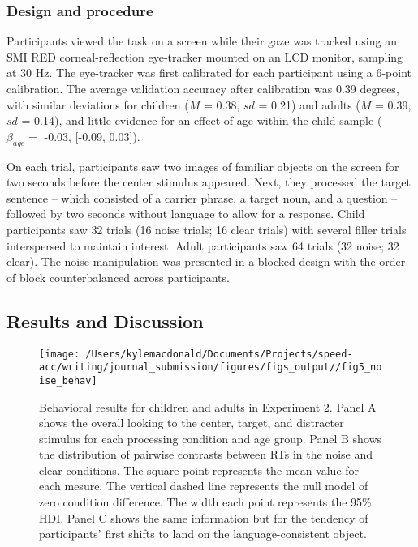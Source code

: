 \documentclass[,man,floatsintext]{apa6}
\begin{document}
\hypertarget{design-and-procedure-1}{%
\subsubsection{Design and procedure}\label{design-and-procedure-1}}

Participants viewed the task on a screen while their gaze was tracked using an SMI RED corneal-reflection eye-tracker mounted on an LCD monitor, sampling at 30 Hz. The eye-tracker was first calibrated for each participant using a 6-point calibration. The average validation accuracy after calibration was 0.39 degrees, with similar deviations for children (\(M\) = 0.38, \(sd\) = 0.21) and adults (\(M\) = 0.39, \(sd\) = 0.14), and little evidence for an effect of age within the child sample (\(\beta_{age} =\) -0.03, {[}-0.09, 0.03{]}).

On each trial, participants saw two images of familiar objects on the screen for two seconds before the center stimulus appeared. Next, they processed the target sentence -- which consisted of a carrier phrase, a target noun, and a question -- followed by two seconds without language to allow for a response. Child participants saw 32 trials (16 noise trials; 16 clear trials) with several filler trials interspersed to maintain interest. Adult participants saw 64 trials (32 noise; 32 clear). The noise manipulation was presented in a blocked design with the order of block counterbalanced across participants.

\hypertarget{results-and-discussion}{%
\subsection{Results and Discussion}\label{results-and-discussion}}

\begin{figure}[!t]

{\centering \texttt{[image: /Users/kylemacdonald/Documents/Projects/speed-acc/writing/journal\_submission/figures/figs\_output//fig5\_noise\_behav]} 

}

\caption{Behavioral results for children and adults in Experiment 2. Panel A shows the overall looking to the center, target, and distracter stimulus for each processing condition and age group. Panel B shows the distribution of pairwise contrasts between RTs in the noise and clear conditions. The square point represents the mean value for each mesure. The vertical dashed line represents the null model of zero condition difference. The width each point represents the 95\% HDI. Panel C shows the same information but for the tendency of participants' first shifts to land on the language-consistent object.}\label{fig:noise-acc-rt-plot}
\end{figure}
\end{document}
